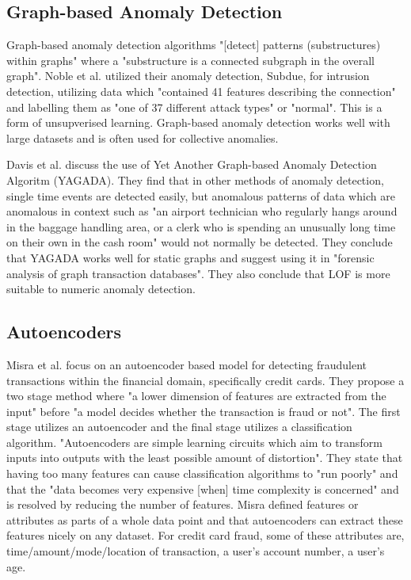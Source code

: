\documentclass[journal]{IEEEtran}
\begin{document}
\subsection{Graph-based Anomaly Detection}
\noindent Graph-based anomaly detection algorithms "[detect] patterns (substructures) within graphs" where a "substructure is a connected subgraph in the overall graph"\cite{Noble2003}. Noble et al. utilized their anomaly detection, Subdue, for intrusion detection, utilizing data which "contained 41 features describing the connection" and labelling them as "one of 37 different attack types" or "normal". This is a form of unsupverised learning\cite{Noble2003}. Graph-based anomaly detection works well with large datasets and is often used for collective anomalies\cite{Egilmez2014}.

Davis et al. discuss the use of Yet Another Graph-based Anomaly Detection Algoritm (YAGADA). They find that in other methods of anomaly detection, single time events are detected easily, but anomalous patterns of data which are anomalous in context such as "an airport technician who regularly hangs around in the baggage handling area, or a clerk who is spending an unusually long time on their own
in the cash room" would not normally be detected. They conclude that YAGADA works well for static graphs and suggest using it in "forensic analysis of graph transaction databases". They also conclude that LOF\cite{Breunig2000} is more suitable to numeric anomaly detection.

\subsection{Autoencoders}
\noindent Misra et al. focus on an autoencoder based model for detecting fraudulent transactions within the financial domain, specifically credit cards\cite{Misra2020}. They propose a two stage method where "a lower dimension of features are extracted from the input" before "a model decides whether the transaction is fraud or not". The first stage utilizes an autoencoder and the final stage utilizes a classification algorithm. "Autoencoders are simple learning circuits which aim to transform inputs into outputs with the least possible amount of distortion"\cite{Baldi2011}. They state that having too many features can cause classification algorithms to "run poorly" and that the "data becomes very expensive [when] time complexity is concerned" and is resolved by reducing the number of features. Misra defined features or attributes as parts of a whole data point and that autoencoders can extract these features nicely on any dataset. For credit card fraud, some of these attributes are, time/amount/mode/location of transaction, a user's account number, a user's age.
\end{document}
